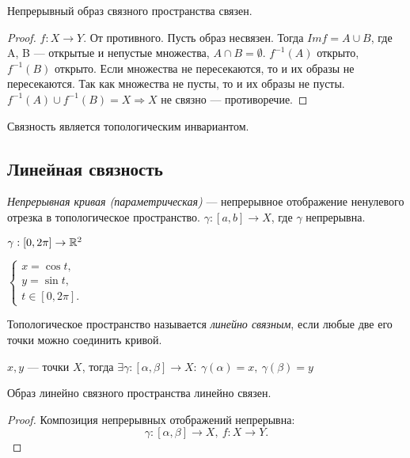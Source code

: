 \begin{statement}
    Непрерывный образ связного пространства связен.
\end{statement}
\begin{proof}
    $f: X \to Y$. От противного. Пусть образ несвязен. Тогда $Im f = A \cup B$, где A, B — открытые и непустые множества, $A \cap B = \emptyset$. $f^{-1}(A)$ открыто, $f^{-1}(B)$ открыто. Если множества не пересекаются, то и их образы не пересекаются. Так как множества не пусты, то и их образы не пусты. $f^{-1}(A) \cup f^{-1}(B) = X \Rightarrow X$ не связно — противоречие. 
\end{proof}

\begin{remark}
    Связность является топологическим инвариантом.
\end{remark}


\subsection{Линейная связность}
\begin{definition}
    \textit{Непрерывная кривая (параметрическая)} — непрерывное отображение ненулевого отрезка в топологическое пространство. $\gamma: [a,b] \to X$, где $\gamma$ непрерывна.
\end{definition}

$\gamma: [0, 2 \pi] \to \mathbb{R}^{2}$

$\begin{cases}
    x = \cos{t}, \\
    y = \sin{t}, \\
    t \in [0, 2 \pi].
\end{cases}$

\begin{definition}
    Топологическое пространство называется \textit{линейно связным}, если любые две его точки можно соединить кривой.
\end{definition}

$x, y$ — точки $X$, тогда $\exists \gamma: [\alpha, \beta] \to X: \ \gamma(\alpha) = x, \ \gamma(\beta) = y$

\begin{statement}
    Образ линейно связного пространства линейно связен.
\end{statement}
\begin{proof}
    Композиция непрерывных отображений непрерывна:
    $$\gamma: [\alpha, \beta] \to X, \ f: X \to Y.$$
\end{proof}

